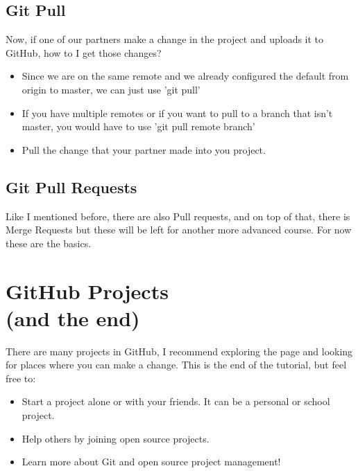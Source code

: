 \documentclass{beamer}
\begin{document}
\subsection{Git Pull}
\begin{frame}
Now, if one of our partners make a change in the project and uploads it to GitHub, how to I get those changes?
\begin{itemize}
 \item Since we are on the same remote and we already configured the default from origin to master, we can just use 'git pull'
 \item If you have multiple remotes or if you want to pull to a branch that isn't master, you would have to use 'git pull remote branch'
 \item Pull the change that your partner made into you project.
\end{itemize}
\end{frame}

\subsection{Git Pull Requests}
\begin{frame}
Like I mentioned before, there are also Pull requests, and on top of that, there is Merge Requests but these will be left for another more advanced course. For now these are the basics.
\end{frame}

\section{GitHub Projects\\(and the end)}
\begin{frame}
There are many projects in GitHub, I recommend exploring the page and looking for places where you can make a change. This is the end of the tutorial, but feel free to:
\begin{itemize}
 \item Start a project alone or with your friends. It can be a personal or school project.
 \item Help others by joining open source projects.
 \item Learn more about Git and open source project management!
\end{itemize}
\end{frame}
\end{document}
